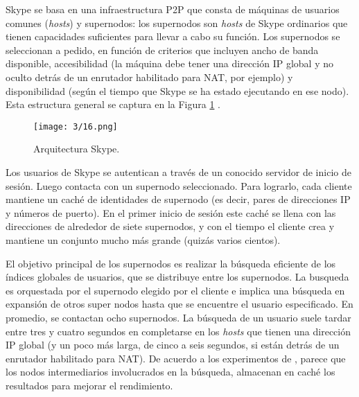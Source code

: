 { 
 \begin{description}  
 	\item[Arquitectura de Skype]  Skype se basa en una infraestructura P2P que consta de  máquinas de usuarios comunes (\textit{hosts}) y supernodos: los supernodos son \textit{hosts} de Skype ordinarios que tienen capacidades suficientes para llevar a cabo su funci\'on. Los supernodos se seleccionan a pedido, en función  de criterios que incluyen ancho de banda disponible, accesibilidad (la máquina debe tener una dirección IP global y no  oculto detrás de un enrutador habilitado para NAT, por ejemplo) y disponibilidad (según el tiempo que Skype se ha estado ejecutando en ese nodo). Esta estructura general   	se captura en la Figura \ref{fig:skype} .
 	
 	
 	  \begin{figure}    
 	  	   \begin{center} %
 		\texttt{[image: 3/16.png]}
 		\caption{Arquitectura Skype.}
 		\label{fig:skype}
 	 \end{center}
   \end{figure} 
 	
 	\item[Conexión de usuario]  Los usuarios de Skype se autentican a través de un conocido servidor de inicio de sesión. Luego contacta con un supernodo seleccionado. Para lograrlo, cada cliente mantiene un caché de identidades de supernodo (es decir, pares de direcciones IP y números de puerto). En el primer inicio de sesión este caché se llena con las direcciones de alrededor de siete supernodos, y con el tiempo el  cliente crea y mantiene un conjunto mucho más grande (quizás varios cientos).
 	
 	\item[Búsqueda de usuarios]  El objetivo principal de los supernodos es realizar la búsqueda eficiente de los índices globales de usuarios, que se distribuye entre los supernodos. La busqueda es orquestada por el supernodo elegido por el cliente e implica una búsqueda en expansión de otros super nodos hasta que se encuentre el usuario especificado. En promedio, se contactan ocho supernodos. La búsqueda de un usuario suele tardar entre tres y cuatro segundos en completarse en los \textit{hosts} que tienen una dirección IP global (y un poco más larga, de cinco a seis segundos, si están detrás de un enrutador habilitado para NAT). De acuerdo a los experimentos de  \cite{Baset2006}, parece que los nodos intermediarios involucrados en la búsqueda, almacenan en caché los resultados para mejorar el rendimiento.
 	

\end{description}}
